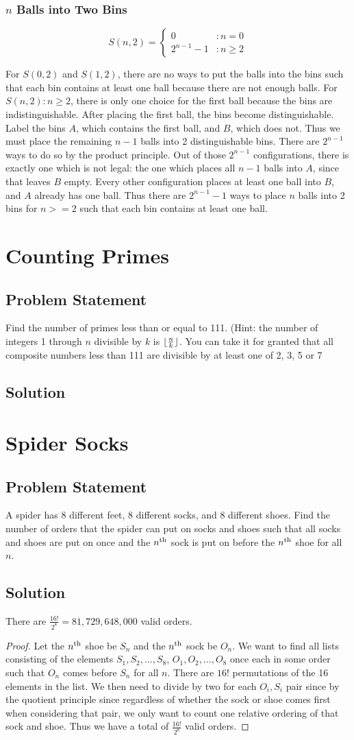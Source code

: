 \documentclass[12pt]{article}
\DeclarePairedDelimiter\floor{\lfloor}{\rfloor}
\newcommand{\ts}[1]{\textsuperscript{#1}}
\newcommand{\ProblemStatement}[1]{
\subsection*{Problem Statement}
#1
\subsection*{Solution}
}
\begin{document}
\subsubsection{$n$ Balls into Two Bins}
\[
    S(n, 2) = 
    \begin{cases}
        0&: n=0\\
        2^{n-1}-1&: n \ge 2
    \end{cases}
\]

For $S(0, 2)$ and $S(1, 2)$, there are no ways to put the balls into the bins such that each bin contains at least one ball because there are not enough balls. For $S(n, 2): n \ge 2$, there is only one choice for the first ball because the bins are indistinguishable. After placing the first ball, the bins become distinguishable. Label the bins $A$, which contains the first ball, and $B$, which does not. Thus we must place the remaining $n-1$ balls into 2 distinguishable bins. There are $2^{n-1}$ ways to do so by the product principle. Out of those $2^{n-1}$ configurations, there is exactly one which is not legal: the one which places all $n-1$ balls into $A$, since that leaves $B$ empty. Every other configuration places at least one ball into $B$, and $A$ already has one ball. Thus there are $2^{n-1}-1$ ways to place $n$ balls into 2 bins for $n >= 2$ such that each bin contains at least one ball.

\section{Counting Primes}
\ProblemStatement{
Find the number of primes less than or equal to 111. (Hint: the number of integers 1 through $n$ divisible by $k$ is $\floor{\frac{n}{k}}$. You can take it for granted that all composite numbers less than 111 are divisible by at least one of 2, 3, 5 or 7
}

\section{Spider Socks}
\ProblemStatement{
A spider has 8 different feet, 8 different socks, and 8 different shoes. Find the number of orders that the spider can put on socks and shoes such that all socks and shoes are put on once and the $n\ts{th}$ sock is put on before the $n\ts{th}$ shoe for all $n$.}
There are $\frac{16!}{2^8} = 81,729,648,000$ valid orders. 

\begin{proof}
Let the $n\ts{th}$ shoe be $S_n$ and the $n\ts{th}$ sock be $O_n$. We want to find all lists consisting of the elements $S_1, S_2, \dots, S_8$, $O_1, O_2, \dots, O_8$ once each in some order such that $O_n$ comes before $S_n$ for all $n$. There are $16!$ permutations of the 16 elements in the list. We then need to divide by two for each $O_i, S_i$ pair since by the quotient principle since regardless of whether the sock or shoe comes first when considering that pair, we only want to count one relative ordering of that sock and shoe. Thus we have a total of $\frac{16!}{2^8}$ valid orders.
\end{proof}
\end{document}
